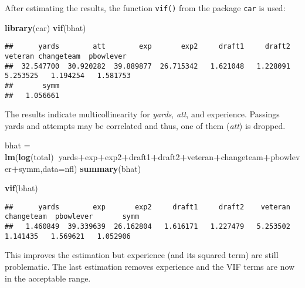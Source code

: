 \documentclass[
]{article}
\newenvironment{Shaded}{\begin{snugshade}}{\end{snugshade}}
\newcommand{\DataTypeTok}[1]{\textcolor[rgb]{0.13,0.29,0.53}{#1}}
\newcommand{\KeywordTok}[1]{\textcolor[rgb]{0.13,0.29,0.53}{\textbf{#1}}}
\newcommand{\NormalTok}[1]{#1}
\newcommand{\OperatorTok}[1]{\textcolor[rgb]{0.81,0.36,0.00}{\textbf{#1}}}
\newcommand{\StringTok}[1]{\textcolor[rgb]{0.31,0.60,0.02}{#1}}
\begin{document}
After estimating the results, the function \texttt{vif()} from the package \texttt{car} is used:

\begin{Shaded}
\begin{Highlighting}[]
\KeywordTok{library}\NormalTok{(car)}
\KeywordTok{vif}\NormalTok{(bhat)}
\end{Highlighting}
\end{Shaded}

\begin{verbatim}
##      yards        att        exp       exp2     draft1     draft2    veteran changeteam  pbowlever 
##  32.547700  30.920282  39.889877  26.715342   1.621048   1.228091   5.253525   1.194254   1.581753 
##       symm 
##   1.056661
\end{verbatim}

The results indicate multicollinearity for \emph{yards}, \emph{att}, and experience. Passings yards and attempts may be correlated and thus, one of them (\emph{att}) is dropped.

\begin{Shaded}
\begin{Highlighting}[]
\NormalTok{bhat =}\StringTok{ }\KeywordTok{lm}\NormalTok{(}\KeywordTok{log}\NormalTok{(total)}\OperatorTok{~}\NormalTok{yards}\OperatorTok{+}\NormalTok{exp}\OperatorTok{+}\NormalTok{exp2}\OperatorTok{+}\NormalTok{draft1}\OperatorTok{+}\NormalTok{draft2}\OperatorTok{+}\NormalTok{veteran}\OperatorTok{+}\NormalTok{changeteam}\OperatorTok{+}\NormalTok{pbowlever}\OperatorTok{+}\NormalTok{symm,}\DataTypeTok{data=}\NormalTok{nfl)}
\KeywordTok{summary}\NormalTok{(bhat)}
\end{Highlighting}
\end{Shaded}

\begin{Shaded}
\begin{Highlighting}[]
\KeywordTok{vif}\NormalTok{(bhat)}
\end{Highlighting}
\end{Shaded}

\begin{verbatim}
##      yards        exp       exp2     draft1     draft2    veteran changeteam  pbowlever       symm 
##   1.460849  39.339639  26.162804   1.616171   1.227479   5.253502   1.141435   1.569621   1.052906
\end{verbatim}

This improves the estimation but experience (and its squared term) are still problematic. The last estimation removes experience and the VIF terms are now in the acceptable range.
\end{document}
